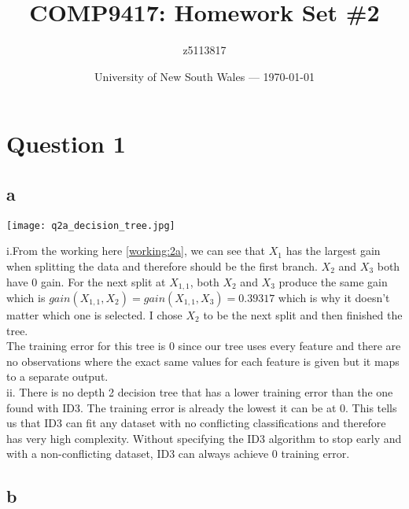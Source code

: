 \documentclass{article}
\title{COMP9417: Homework Set \#2} %
\author{z5113817} %
\date{University of New South Wales --- \today} %
\begin{document}




\section*{Question 1}

\subsection*{a}

\texttt{[image: q2a\_decision\_tree.jpg]}

i.From the working here \ref{working:2a}, we can see that \(X_{1}\) has the largest gain when splitting the data and therefore
should be the first branch. \(X_{2}\) and \(X_{3}\) both have 0 gain. For the next split at \(X_{1,1}\), both \(X_{2}\) and \(X_{3}\)
produce the same gain which is \(gain(X_{1,1}, X_{2}) = gain(X_{1,1}, X_{3}) = 0.39317\) which is why it doesn't matter which one is selected.
I chose \(X_{2}\) to be the next split and then finished the tree.\\

The training error for this tree is 0 since our tree uses every feature and there are no observations where the exact same
values for each feature is given but it maps to a separate output.\\

ii. There is no depth 2 decision tree that has a lower training error than the one found with ID3.
The training error is already the lowest it can be at 0. This tells us that ID3 can fit any dataset
with no conflicting classifications and therefore has very high complexity. Without specifying the ID3 algorithm to 
stop early and with a non-conflicting dataset, ID3 can always achieve 0 training error. 

\subsection*{b}
\end{document}
